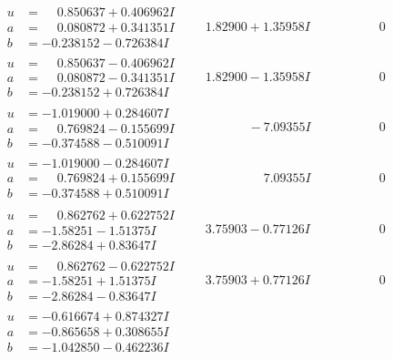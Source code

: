 \documentclass[1p]{elsarticle_modified}
\theoremstyle{definition}
\begin{document}
$$\begin{array}{c|c|c}
\begin{aligned}
u &= \phantom{-}0.850637 + 0.406962 I \\
a &= \phantom{-}0.080872 + 0.341351 I \\
b &= -0.238152 - 0.726384 I\end{aligned}
 & \phantom{-}1.82900 + 1.35958 I & \phantom{-0.000000 } 0 \\ \hline\begin{aligned}
u &= \phantom{-}0.850637 - 0.406962 I \\
a &= \phantom{-}0.080872 - 0.341351 I \\
b &= -0.238152 + 0.726384 I\end{aligned}
 & \phantom{-}1.82900 - 1.35958 I & \phantom{-0.000000 } 0 \\ \hline\begin{aligned}
u &= -1.019000 + 0.284607 I \\
a &= \phantom{-}0.769824 - 0.155699 I \\
b &= -0.374588 - 0.510091 I\end{aligned}
 & \phantom{-0.000000 } -7.09355 I & \phantom{-0.000000 } 0 \\ \hline\begin{aligned}
u &= -1.019000 - 0.284607 I \\
a &= \phantom{-}0.769824 + 0.155699 I \\
b &= -0.374588 + 0.510091 I\end{aligned}
 & \phantom{-0.000000 -}7.09355 I & \phantom{-0.000000 } 0 \\ \hline\begin{aligned}
u &= \phantom{-}0.862762 + 0.622752 I \\
a &= -1.58251 - 1.51375 I \\
b &= -2.86284 + 0.83647 I\end{aligned}
 & \phantom{-}3.75903 - 0.77126 I & \phantom{-0.000000 } 0 \\ \hline\begin{aligned}
u &= \phantom{-}0.862762 - 0.622752 I \\
a &= -1.58251 + 1.51375 I \\
b &= -2.86284 - 0.83647 I\end{aligned}
 & \phantom{-}3.75903 + 0.77126 I & \phantom{-0.000000 } 0 \\ \hline\begin{aligned}
u &= -0.616674 + 0.874327 I \\
a &= -0.865658 + 0.308655 I \\
b &= -1.042850 - 0.462236 I\end{aligned}

\end{array}$$
\end{document}

